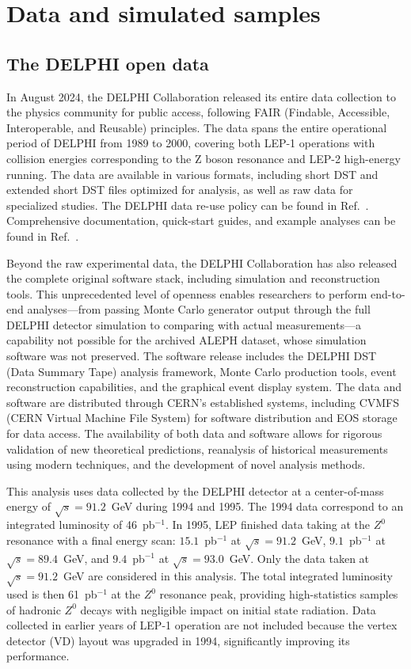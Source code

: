 \documentclass[a4paper,11pt]{article}
\begin{document}
\clearpage
\section{Data and simulated samples}
\label{sec:sample}
\subsection{The DELPHI open data}
In August 2024, the DELPHI Collaboration released its entire data collection to the physics community for public access, following FAIR (Findable, Accessible, Interoperable, and Reusable) principles. 
The data spans the entire operational period of DELPHI from 1989 to 2000, covering both LEP-1 operations with collision energies corresponding to the Z boson resonance and LEP-2 high-energy running.
The data are available in various formats, including short DST and extended short DST files optimized for analysis, as well as raw data for specialized studies.
The DELPHI data re-use policy can be found in Ref.~\cite{DELPHI:2024policy}. 
Comprehensive documentation, quick-start guides, and example analyses can be found in Ref.~\cite{DELPHI:2024opendata}. 

Beyond the raw experimental data, the DELPHI Collaboration has also released the complete original software stack, including simulation and reconstruction tools. This unprecedented level of openness enables researchers to perform end-to-end analyses---from passing Monte Carlo generator output through the full DELPHI detector simulation to comparing with actual measurements---a capability not possible for the archived ALEPH dataset, whose simulation software was not preserved. The software release includes the DELPHI DST (Data Summary Tape) analysis framework, Monte Carlo production tools, event reconstruction capabilities, and the graphical event display system. The data and software are distributed through CERN's established systems, including CVMFS (CERN Virtual Machine File System) for software distribution and EOS storage for data access. The availability of both data and software allows for rigorous validation of new theoretical predictions, reanalysis of historical measurements using modern techniques, and the development of novel analysis methods.

This analysis uses data collected by the DELPHI detector at a center-of-mass energy of $\sqrt{s} = 91.2$~GeV during 1994 and 1995.
The 1994 data correspond to an integrated luminosity of 46~pb$^{-1}$. 
In 1995, LEP finished data taking at the $Z^0$ resonance with a final energy scan: $15.1$~pb$^{-1}$ at $\sqrt{s} = 91.2$~GeV, $9.1$~pb$^{-1}$ at $\sqrt{s} = 89.4$~GeV, and $9.4$~pb$^{-1}$ at $\sqrt{s} = 93.0$~GeV.
Only the data taken at $\sqrt{s} = 91.2$~GeV are considered in this analysis.
The total integrated luminosity used is then 61~pb$^{-1}$ at the $Z^0$ resonance peak, providing high-statistics samples of hadronic $Z^0$ decays with negligible impact on initial state radiation.
Data collected in earlier years of LEP-1 operation are not included because the vertex detector (VD) layout was upgraded in 1994, significantly improving its performance.
\end{document}
